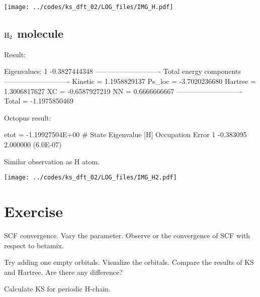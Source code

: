 {\centering
\texttt{[image: ../codes/ks\_dft\_02/LOG\_files/IMG\_H.pdf]}
}

\subsection{$\ce{H2}$ molecule}

Result:
\begin{textcode}
Eigenvalues:
 1      -0.3827444348
----------------------------
Total energy components
----------------------------
Kinetic =       1.1958829137
Ps_loc  =      -3.7020236680
Hartree =       1.3006817627
XC      =      -0.6587927219
NN      =       0.6666666667
----------------------------
Total   =      -1.1975850469
\end{textcode}

Octopus result:
\begin{textcode}
 etot  = -1.19927504E+00
#  State  Eigenvalue [H]  Occupation    Error
      1       -0.383095    2.000000   (6.0E-07) 
\end{textcode}

Similar observation as H atom.

{\centering
\texttt{[image: ../codes/ks\_dft\_02/LOG\_files/IMG\_H2.pdf]}
}


\section{Exercise}

SCF convergence. Vary the  parameter. Observe or the convergence
of SCF with respect to betamix.

Try adding one empty orbitals. Visualize the orbitals. Compare the results of
KS and Hartree. Are there any difference?

Calculate KS for periodic H-chain.